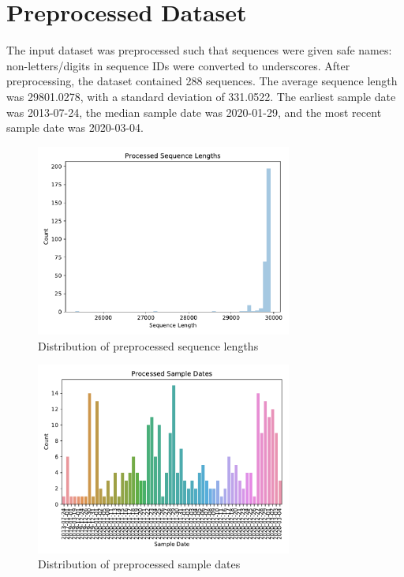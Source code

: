 \documentclass{article}
\begin{document}
\section{Preprocessed Dataset}
The input dataset was preprocessed such that sequences were given safe names: non-letters/digits in sequence IDs were converted to underscores.
After preprocessing, the dataset contained 288 sequences.
The average sequence length was 29801.0278,
with a standard deviation of 331.0522.
The earliest sample date was 2013-07-24,
the median sample date was 2020-01-29,
and the most recent sample date was 2020-03-04.


\begin{figure}[h]
\centering
\includegraphics[width=0.75\textwidth,keepaspectratio]{./figs/processed_sequence_lengths.pdf}
\caption{Distribution of preprocessed sequence lengths}
\end{figure}



\begin{figure}[h]
\centering
\includegraphics[width=0.75\textwidth,keepaspectratio]{./figs/processed_sample_dates.pdf}
\caption{Distribution of preprocessed sample dates}
\end{figure}
\end{document}
